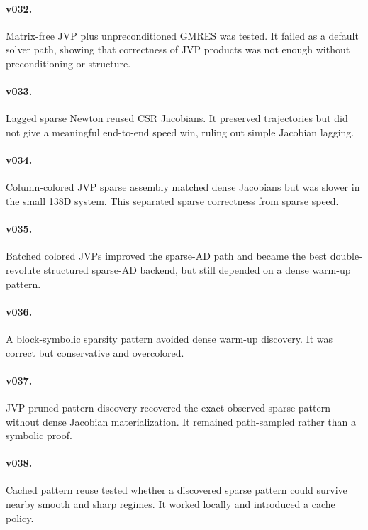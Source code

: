 \documentclass[10pt]{article}
\begin{document}
\paragraph{v032.}
Matrix-free JVP plus unpreconditioned GMRES was tested. It failed as a default
solver path, showing that correctness of JVP products was not enough without
preconditioning or structure.

\paragraph{v033.}
Lagged sparse Newton reused CSR Jacobians. It preserved trajectories but did
not give a meaningful end-to-end speed win, ruling out simple Jacobian lagging.

\paragraph{v034.}
Column-colored JVP sparse assembly matched dense Jacobians but was slower in
the small 138D system. This separated sparse correctness from sparse speed.

\paragraph{v035.}
Batched colored JVPs improved the sparse-AD path and became the best
double-revolute structured sparse-AD backend, but still depended on a dense
warm-up pattern.

\paragraph{v036.}
A block-symbolic sparsity pattern avoided dense warm-up discovery. It was
correct but conservative and overcolored.

\paragraph{v037.}
JVP-pruned pattern discovery recovered the exact observed sparse pattern
without dense Jacobian materialization. It remained path-sampled rather than a
symbolic proof.

\paragraph{v038.}
Cached pattern reuse tested whether a discovered sparse pattern could survive
nearby smooth and sharp regimes. It worked locally and introduced a cache
policy.
\end{document}
